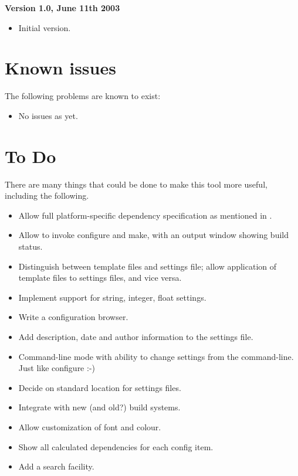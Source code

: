 {\bf Version 1.0, June 11th 2003}

\begin{itemize}\itemsep=10pt
\item Initial version.
\end{itemize}

\section{Known issues}\label{knownissues}

The following problems are known to exist:

\begin{itemize}\itemsep=10pt
\item No issues as yet.
\end{itemize}

\section{To Do}\label{todo}

There are many things that could be done to make
this tool more useful, including the following.

\begin{itemize}\itemsep=10pt
\item Allow full platform-specific dependency specification
as mentioned in .
\item Allow \ctshortname to invoke configure and make, with an output
window showing build status.
\item Distinguish between template files and settings file; allow
application of template files to settings files, and vice versa.
\item Implement support for string, integer, float settings.
\item Write a configuration browser.
\item Add description, date and author information to the settings file.
\item Command-line mode with ability to change settings from
the command-line. Just like configure :-)
\item Decide on standard location for settings files.
\item Integrate with new (and old?) build systems.
\item Allow customization of font and colour.
\item Show all calculated dependencies for each config item.
\item Add a search facility.
\end{itemize}


